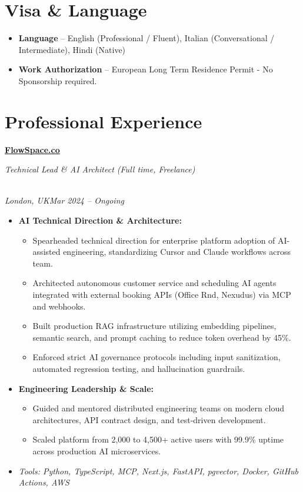 \documentclass[a4paper,10pt]{article}
\newcommand{\role}[4]{\vspace{3pt}\noindent\hspace{0.6em}\parbox[t]{0.38\textwidth}{\raggedright\textbf{#1}}\hfill\parbox[t]{0.58\textwidth}{\raggedleft\textit{#2}}\\{\textit{#3}\hfill\textit{#4}}\vspace{1pt}}
\begin{document}
\section{Visa \& Language}
\begin{itemize}
\item \textbf{Language} -- English (Professional / Fluent), Italian (Conversational / Intermediate), Hindi (Native)
\item \textbf{Work Authorization} -- European Long Term Residence Permit - No Sponsorship required.
\end{itemize}

\section{Professional Experience}
\role{\href{https://flowspace.co}{FlowSpace.co}}{Technical Lead \& AI Architect (Full time, Freelance)}{London, UK}{Mar 2024 -- Ongoing}
\begin{itemize}
\item \textbf{AI Technical Direction \& Architecture:}
\begin{itemize}[label=--]
\item Spearheaded technical direction for enterprise platform adoption of AI-assisted engineering, standardizing Cursor and Claude workflows across team.
\item Architected autonomous customer service and scheduling AI agents integrated with external booking APIs (Office Rnd, Nexudus) via MCP and webhooks.
\item Built production RAG infrastructure utilizing embedding pipelines, semantic search, and prompt caching to reduce token overhead by 45\%.
\item Enforced strict AI governance protocols including input sanitization, automated regression testing, and hallucination guardrails.
\end{itemize}
\item \textbf{Engineering Leadership \& Scale:}
\begin{itemize}[label=--]
\item Guided and mentored distributed engineering teams on modern cloud architectures, API contract design, and test-driven development.
\item Scaled platform from 2,000 to 4,500+ active users with 99.9\% uptime across production AI microservices.
\end{itemize}
\item \textit{Tools: Python, TypeScript, MCP, Next.js, FastAPI, pgvector, Docker, GitHub Actions, AWS}
\end{itemize}
\end{document}
